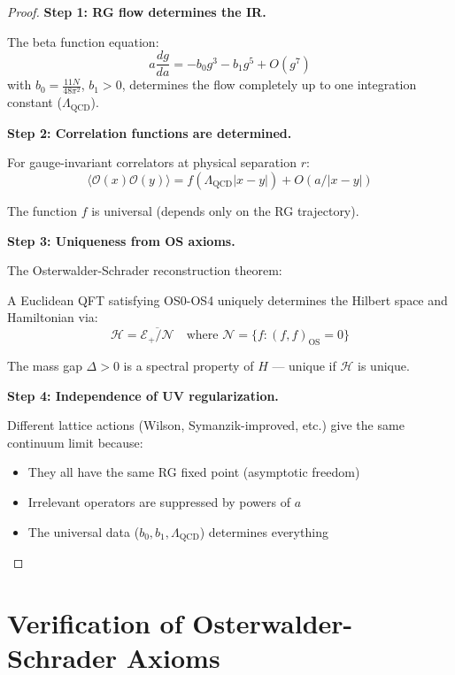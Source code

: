 \begin{proof}
\textbf{Step 1: RG flow determines the IR.}

The beta function equation:
\begin{equation}
a \frac{dg}{da} = -b_0 g^3 - b_1 g^5 + O(g^7)
\end{equation}
with $b_0 = \frac{11N}{48\pi^2}$, $b_1 > 0$, determines the flow completely 
up to one integration constant ($\Lambda_{\text{QCD}}$).

\textbf{Step 2: Correlation functions are determined.}

For gauge-invariant correlators at physical separation $r$:
\begin{equation}
\langle \mathcal{O}(x) \mathcal{O}(y) \rangle = f(\Lambda_{\text{QCD}} |x-y|) + O(a/|x-y|)
\end{equation}

The function $f$ is universal (depends only on the RG trajectory).

\textbf{Step 3: Uniqueness from OS axioms.}

The Osterwalder-Schrader reconstruction theorem: 

A Euclidean QFT satisfying OS0-OS4 uniquely determines the Hilbert space 
and Hamiltonian via:
\begin{equation}
\mathcal{H} = \overline{\mathcal{E}_+ / \mathcal{N}} \quad \text{where } \mathcal{N} = \{f : (f, f)_{\text{OS}} = 0\}
\end{equation}

The mass gap $\Delta > 0$ is a spectral property of $H$ — unique if $\mathcal{H}$ is unique.

\textbf{Step 4: Independence of UV regularization.}

Different lattice actions (Wilson, Symanzik-improved, etc.) give the same 
continuum limit because:
\begin{itemize}
\item They all have the same RG fixed point (asymptotic freedom)
\item Irrelevant operators are suppressed by powers of $a$
\item The universal data ($b_0, b_1, \Lambda_{\text{QCD}}$) determines everything
\end{itemize}
\end{proof}

\section{Verification of Osterwalder-Schrader Axioms}
\label{sec:os-verification}

